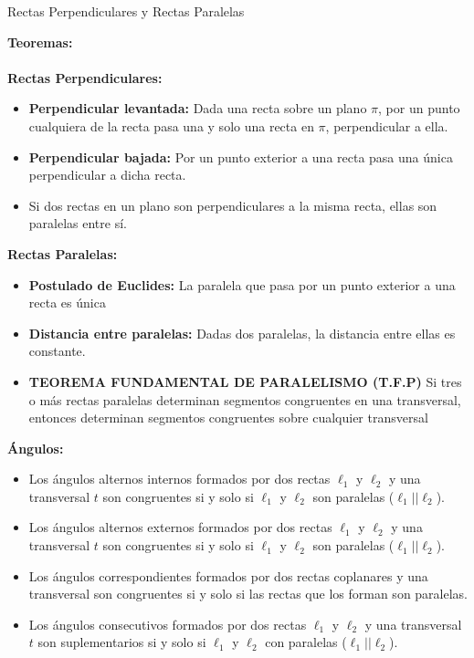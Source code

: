 \documentclass[•]{article}
\begin{document}
\begin{center}
\Large{Rectas Perpendiculares y Rectas Paralelas}
\end{center}


\textbf{Teoremas: \\ \\ Rectas Perpendiculares:}

\begin{itemize}
	\item \textbf{Perpendicular levantada: } Dada una recta sobre un plano $\pi$, por un punto cualquiera de la recta pasa una y solo una recta en $\pi$, perpendicular a ella.
	\item \textbf{Perpendicular bajada: } Por un punto exterior a una recta pasa una \'unica perpendicular a dicha recta.
	\item Si dos rectas en un plano son perpendiculares a la misma recta, ellas son paralelas entre s\'i.
	

\end{itemize}

\textbf{Rectas Paralelas:}
\begin{itemize}
\item \textbf{Postulado de Euclides: }La paralela que pasa por un punto exterior a una recta es \'unica
\item \textbf{Distancia entre paralelas: } Dadas dos paralelas, la distancia entre ellas es constante.

\item \textbf{TEOREMA FUNDAMENTAL DE PARALELISMO (T.F.P)} Si tres o m\'as rectas paralelas determinan segmentos congruentes en una transversal, entonces determinan segmentos congruentes sobre cualquier transversal
\end{itemize}

\textbf{\'Angulos:}
\begin{itemize}
\item Los \'angulos alternos internos formados por dos rectas $\ell_1$ y $\ell_2$ y una transversal $t$ son congruentes si y solo si $\ell_1$ y $\ell_2$ son paralelas ($\ell_1  ||  \ell_2$).

\item Los \'angulos alternos externos formados por dos rectas $\ell_1$ y $\ell_2$ y una transversal $t$ son congruentes si y solo si $\ell_1$ y $\ell_2$ son paralelas ($\ell_1 || \ell_2$).

\item Los \'angulos correspondientes formados por dos rectas coplanares y una transversal son congruentes si y solo si las rectas que los forman son paralelas.

\item Los \'angulos consecutivos formados por dos rectas $\ell_1$ y $\ell_2$ y una transversal $t$ son suplementarios si y solo si $\ell_1$ y $\ell_2$ con paralelas ($\ell_1  ||  \ell_2$).
\end{itemize}
\end{document}
